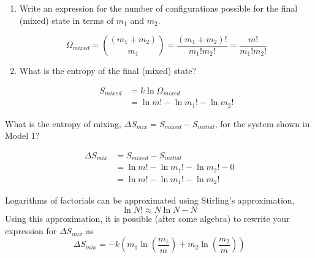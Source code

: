 \begin{activity}
\begin{ctqs}
\begin{enumerate}
				\item Write an expression for the number of configurations possible for the final (mixed) state in terms of $m_1$ and $m_2$.
				
					\begin{solution}[1in]
						\begin{equation*}
							\Omega_{mixed} = {(m_1+m_2) \choose m_1} = \frac{(m_1+m_2)!}{m_1! m_2!} = \frac{m!}{m_1! m_2!}
						\end{equation*}
					\end{solution}
					
				\item What is the entropy of the final (mixed) state?
				
					\begin{solution}[1in]
						\begin{align*}
							S_{mixed} &= k \ln \Omega_{mixed}\\
							&= \ln m! - \ln m_1! - \ln m_2!
						\end{align*}
					\end{solution}
				
				
			\end{enumerate}
		\question What is the entropy of mixing, $\Delta S_{mix} = S_{mixed} - S_{initial}$, for the system shown in Model 1?
				
					\begin{solution}[1in]
						\begin{align*}
							\Delta S_{mix} &= S_{mixed} - S_{initial}\\
							 &= \ln m! - \ln m_1! - \ln m_2! - 0 \\
							 &= \ln m! - \ln m_1! - \ln m_2!
						\end{align*}
					\end{solution}
\end{ctqs}

\begin{infobox}
	Logarithms of factorials can be approximated using Stirling's approximation,
	\begin{equation*}
		\ln N! \approx N \ln N - N \label{eqn:stirling}
	\end{equation*}
	Using this approximation, it is possible (after some algebra) to rewrite your expression for $\Delta S_{mix}$ as
	\begin{equation*}
		\Delta S_{mix} = -k\left(m_1 \ln\left(\frac{m_1}{m}\right) + m_2 \ln\left(\frac{m_2}{m}\right) \right)
	\end{equation*}
\end{infobox}


\end{activity}
